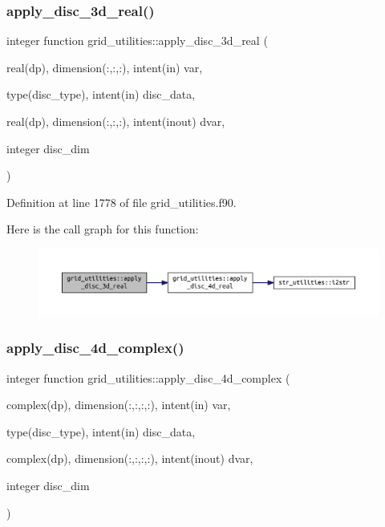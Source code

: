 \subsubsection{\texorpdfstring{apply\+\_\+disc\+\_\+3d\+\_\+real()}{apply\_disc\_3d\_real()}}
{\footnotesize\ttfamily integer function grid\+\_\+utilities\+::apply\+\_\+disc\+\_\+3d\+\_\+real (\begin{DoxyParamCaption}\item[{real(dp), dimension(\+:,\+:,\+:), intent(in)}]{var,  }\item[{type(disc\+\_\+type), intent(in)}]{disc\+\_\+data,  }\item[{real(dp), dimension(\+:,\+:,\+:), intent(inout)}]{dvar,  }\item[{integer}]{disc\+\_\+dim }\end{DoxyParamCaption})}



Definition at line 1778 of file grid\+\_\+utilities.\+f90.

Here is the call graph for this function\+:
\nopagebreak
\begin{figure}[H]
\begin{center}
\leavevmode
\includegraphics[width=350pt]{namespacegrid__utilities_a876f338471e643a680893b9a19715016_cgraph}
\end{center}
\end{figure}
\mbox{\label{namespacegrid__utilities_a7fcde4b046076294fc8d2ca130f84add}} 
\subsubsection{\texorpdfstring{apply\+\_\+disc\+\_\+4d\+\_\+complex()}{apply\_disc\_4d\_complex()}}
{\footnotesize\ttfamily integer function grid\+\_\+utilities\+::apply\+\_\+disc\+\_\+4d\+\_\+complex (\begin{DoxyParamCaption}\item[{complex(dp), dimension(\+:,\+:,\+:,\+:), intent(in)}]{var,  }\item[{type(disc\+\_\+type), intent(in)}]{disc\+\_\+data,  }\item[{complex(dp), dimension(\+:,\+:,\+:,\+:), intent(inout)}]{dvar,  }\item[{integer}]{disc\+\_\+dim }\end{DoxyParamCaption})}



